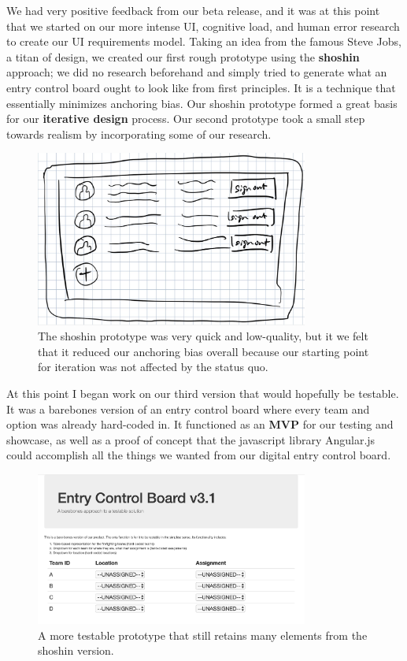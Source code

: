\documentclass[a4paper,12pt]{article}
\begin{document}
We had very positive feedback from our beta release, and it was at this point that we started on our more intense UI, cognitive load, and human error research to create our UI requirements model. Taking an idea from the famous Steve Jobs, a titan of design, we created our first rough prototype using the \textbf{shoshin} approach; we did no research beforehand and simply tried to generate what an entry control board ought to look like from first principles. It is a technique that essentially minimizes anchoring bias. Our shoshin prototype formed a great basis for our \textbf{iterative design} process. Our second prototype took a small step towards realism by incorporating some of our research.

\begin{figure}[H]
\centering
\includegraphics[width=0.8\textwidth]{img/image017.png}
\caption{The shoshin prototype was very quick and low-quality, but it we felt that it reduced our anchoring bias overall because our starting point for iteration was not affected by the status quo.}
\label{}
\end{figure}

At this point I began work on our third version that would hopefully be testable. It was a barebones version of an entry control board where every team and option was already hard-coded in. It functioned as an \textbf{MVP} for our testing and showcase, as well as a proof of concept that the javascript library Angular.js could accomplish all the things we wanted from our digital entry control board.

\begin{figure}[H]
\centering
\includegraphics[width=0.8\textwidth]{img/image018.png}
\caption{A more testable prototype that still retains many elements from the shoshin version.}
\label{}
\end{figure}
\end{document}
